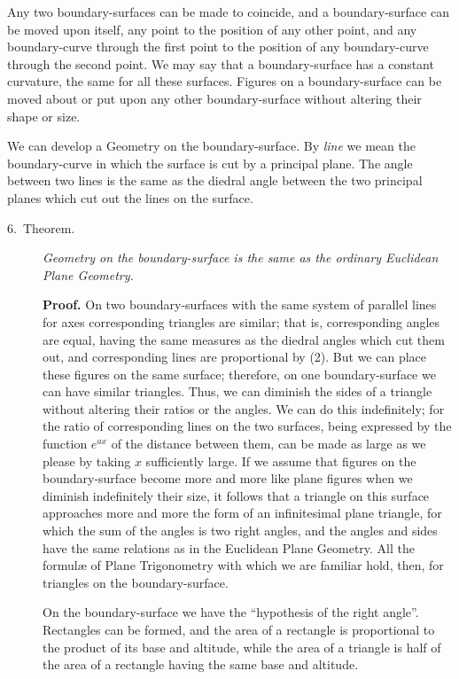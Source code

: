 Any two boundary-surfaces can be made to coincide, and a
boundary-surface can be moved upon itself, any point to the position
of any other point, and any boundary-curve through the first point
to the position of any boundary-curve through the second point. We
may say that a boundary-surface has a constant curvature, the same
for all these surfaces. Figures on a boundary-surface can be moved
about or put upon any other boundary-surface without altering their
shape or size.

We can develop a Geometry on the boundary-surface. By \emph{line} we
mean the boundary-curve in which the surface is cut by a principal
plane. The angle between two lines is the same as the diedral angle
between the two principal planes which cut out the lines on the
surface.

\begin{description}
\item[6.~Theorem.] \emph{Geometry on the boundary-surface is the
same as the ordinary Euclidean Plane Geometry.}

\textbf{Proof.} On two boundary-surfaces with the same system of
parallel lines for axes corresponding triangles are similar; that
is, corresponding angles are equal, having the same measures as the
diedral angles which cut them out, and corresponding lines are
proportional by (2). But we can place these figures on the same
surface; therefore, on one boundary-surface we can have similar
triangles. Thus, we can diminish the sides of a triangle without
altering their ratios or the angles. We can do this indefinitely;
for the ratio of corresponding lines on the two surfaces, being
expressed by the function $e^{ax}$ of the distance between them, can
be made as large as we please by taking $x$ sufficiently large. If
we assume that figures on the boundary-surface become more and more
like plane figures when we diminish indefinitely their size, it
follows that a triangle on this surface approaches more and more the
form of an infinitesimal plane triangle, for which the sum of the
angles is two right angles, and the angles and sides have the same
relations as in the Euclidean Plane Geometry. All the formulæ of
Plane Trigonometry with which we are familiar hold, then, for
triangles on the boundary-surface.

On the boundary-surface we have the ``hypothesis of the
right angle''. Rectangles can be formed, and the area of a
rectangle is proportional to the product of its base and altitude,
while the area of a triangle is half of the area of a
rectangle having the same base and altitude.
\end{description}

